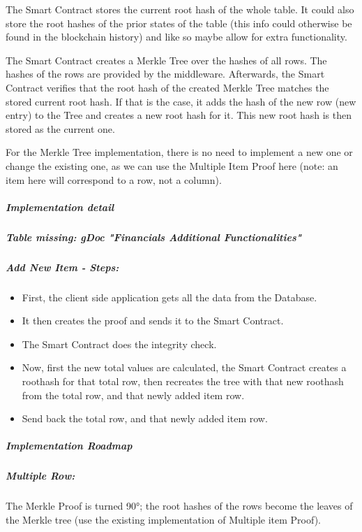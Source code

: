The Smart Contract stores the current root hash of the whole table. It could also store the root hashes of the prior states of the table (this info could otherwise be found in the blockchain history) and like so maybe allow for extra functionality.

The Smart Contract creates a Merkle Tree over the hashes of all rows. The hashes of the rows are provided by the middleware. Afterwards, the Smart Contract verifies that the root hash of the created Merkle Tree matches the stored current root hash. If that is the case, it adds the hash of the new row (new entry) to the Tree and creates a new root hash for it. This new root hash is then stored as the current one.

For the Merkle Tree implementation, there is no need to implement a new one or change the existing one, as we can use the Multiple Item Proof here (note: an item here will correspond to a row, not a column).

\subparagraph{Implementation detail}
\subparagraph{Table missing: gDoc "Financials Additional Functionalities"}

\subparagraph{Add New Item - Steps:}
\begin{itemize}
\item First, the client side application gets all the data from the Database.
\item It then creates the proof and sends it to the Smart Contract.
\item The Smart Contract does the integrity check.
\item Now, first the new total values are calculated, the Smart Contract creates a roothash for that total row, then recreates the tree with that new roothash from the total row, and that newly added item row.
\item Send back the total row, and that newly added item row.
\end{itemize}

\subparagraph{Implementation Roadmap}

\subparagraph{Multiple Row:}
The Merkle Proof is turned 90°; the root hashes of the rows become the leaves of the Merkle tree (use the existing implementation of Multiple item Proof).

